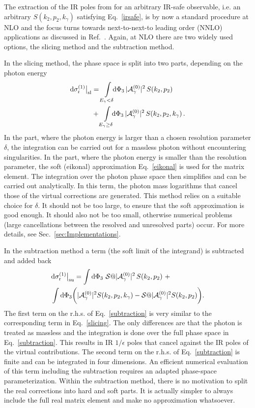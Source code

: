 The extraction of the IR poles from  for an arbitrary
IR-safe observable, i.e. an arbitrary $S(k_2,p_2,k_\gamma)$ satisfying
Eq.~\ref{irsafe}, is by now a standard procedure at NLO and the focus
turns towards next-to-next-to leading order (NNLO) applications as discussed in Ref.~\cite{TorresBobadilla:2020ekr}. Again,
at NLO there are two widely used options, the slicing method and the
subtraction method.

In the slicing method, the phase space is split into two parts,
depending on the photon energy
\begin{align}\label{slicing}
  \mathrm{d}\sigma^{(1)}_{\rm r}\big|_\text{sl}
  &=
  \int\displaylimits_{E_\gamma<\delta} \hspace*{-5pt}
  \mathrm{d}\Phi_3\, |{\mathcal A}_\gamma^{(0)}|^2\,S(k_2,p_2)
\nonumber \\
 &+ \int\displaylimits_{E_\gamma\ge\delta} \hspace*{-5pt}
 \mathrm{d}\Phi_3\, |{\mathcal A}_\gamma^{(0)}|^2\,S(k_2,p_2,k_\gamma)
\, .
\end{align}
In the part, where the photon energy is larger than a chosen resolution
parameter $\delta$, the integration can be carried out for a massless
photon without encountering singularities. In the part, where the
photon energy is smaller than the resolution parameter, the soft
(eikonal) approximation Eq.~\ref{eikonal} is used for the matrix
element. The integration over the photon phase space then simplifies
and can be carried out analytically. In this term, the photon mass
logarithms that cancel those of the virtual
corrections are generated. This method relies on a suitable choice for $\delta$. It should not be too large, to ensure
that the soft approximation is good enough. It should also not be too
small, otherwise numerical problems (large cancellations between the
resolved and unresolved parts) occur. For more details, see Sec.~\ref{sec:Implementations}.

In the subtraction method a term (the soft limit of the integrand) is
subtracted and added back
\begin{align}\label{subtraction}
  &\dd\sigma^{(1)}_{\rm r}\big|_\text{su}  =  \int \dd\Phi_3\ \mathcal{S}@ |\AMP_\gamma^{(0)}|^2  \,S(k_2,p_2) \ +\nonumber \\
   &\int \dd\Phi_3 \bigg(|\AMP_\gamma^{(0)}|^2S(k_2,p_2,k_\gamma) -\mathcal{S}@ |\AMP_\gamma^{(0)}|^2S(k_2,p_2)\bigg).
\end{align}
The first term on the r.h.s. of Eq.~\ref{subtraction} is very similar to
the corresponding term in Eq.~\ref{slicing}. The only differences are
that the photon is treated as massless and the integration is done
over the full phase space in Eq.~\ref{subtraction}. This results in
IR $1/\epsilon$ poles that cancel against the IR poles of the virtual
contributions. The second term on the r.h.s. of Eq.~\ref{subtraction} is
finite and can be integrated in four dimensions. An efficient numerical
evaluation of this term including the subtraction requires an adapted
phase-space parameterization. Within the subtraction method, there is
no motivation to split the real corrections into hard and soft
parts. It is actually simpler to always include the full real matrix
element and make no approximation whatsoever.


